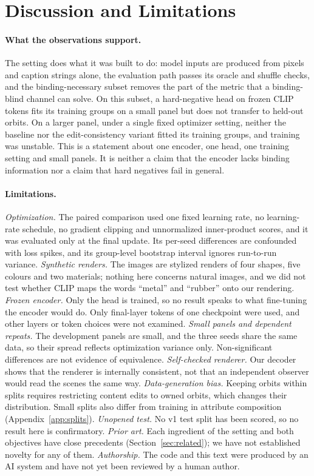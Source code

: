 \section{Discussion and Limitations}
\label{sec:discussion}

\paragraph{What the observations support.}
The setting does what it was built to do: model inputs are produced from pixels and caption strings
alone, the evaluation path passes its oracle and shuffle checks, and the binding-necessary subset
removes the part of the metric that a binding-blind channel can solve. On this subset, a
hard-negative head on frozen CLIP tokens fits its training groups on a small panel but does not
transfer to held-out orbits. On a larger panel, under a single fixed optimizer setting, neither the
baseline nor the edit-consistency variant fitted its training groups, and training was unstable. This is a statement about one encoder, one head, one
training setting and small panels. It is neither a claim that the encoder lacks binding
information nor a claim that hard negatives fail in general.

\paragraph{Limitations.}
\emph{Optimization.} The paired comparison used one fixed learning rate, no learning-rate
schedule, no gradient clipping and unnormalized inner-product scores, and it was evaluated only at
the final update. Its per-seed differences are confounded with loss spikes, and its group-level
bootstrap interval ignores run-to-run variance. \emph{Synthetic renders.} The images are stylized renders of four shapes, five colours and two
materials; nothing here concerns natural images, and we did not test whether CLIP maps the words
``metal'' and ``rubber'' onto our rendering. \emph{Frozen encoder.} Only the head is trained, so no
result speaks to what fine-tuning the encoder would do. Only final-layer tokens of one checkpoint
were used, and other layers or token choices were not examined. \emph{Small panels and dependent
repeats.} The development panels are small, and the three seeds share the same data, so their
spread reflects optimization variance only. Non-significant differences are not evidence of
equivalence. \emph{Self-checked renderer.} Our decoder shows that the renderer is internally
consistent, not that an independent observer would read the scenes the same way.
\emph{Data-generation bias.} Keeping orbits within splits requires restricting content edits to
owned orbits, which changes their distribution. Small splits also differ from training in
attribute composition (Appendix~\ref{app:splits}). \emph{Unopened test.}
No v1 test split has been scored, so no result here is confirmatory. \emph{Prior art.} Each
ingredient of the setting and both objectives have close precedents
(Section~\ref{sec:related}); we have not established novelty for any of them. \emph{Authorship.}
The code and this text were produced by an AI system and have not yet been reviewed by a human
author.

